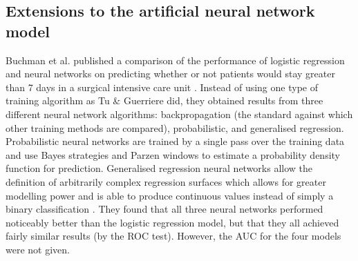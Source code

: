 \subsection{Extensions to the artificial neural network model}
Buchman et al. published a comparison of the performance of logistic regression
and neural networks on predicting whether or not patients would stay greater
than 7 days in a surgical intensive care unit \citep{Buchman1994}. Instead of
using one type of training algorithm as Tu \& Guerriere did, they obtained
results from three different neural network algorithms: backpropagation (the
standard against which other training methods are compared), probabilistic, and
generalised regression. Probabilistic neural networks are trained by a single
pass over the training data and use Bayes strategies and Parzen windows to
estimate a probability density function for prediction. Generalised regression
neural networks allow the definition of arbitrarily complex regression surfaces
which allows for greater modelling power and is able to produce continuous
values instead of simply a binary classification \citep{Sprecht1991}. They found
that all three neural networks performed noticeably better than the logistic
regression model, but that they all achieved fairly similar results (by the ROC
test). However, the AUC for the four models were not given.

